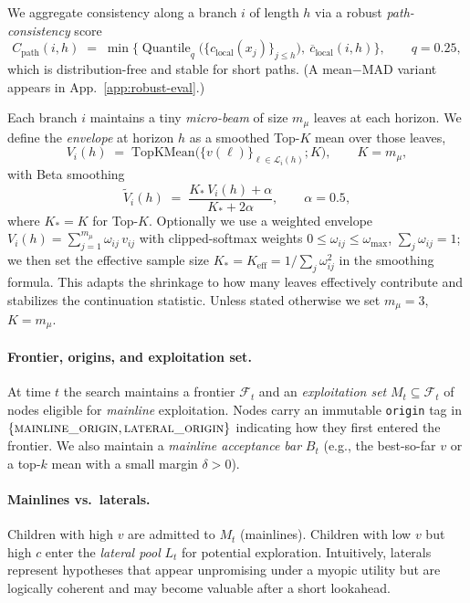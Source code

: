 \documentclass{article}
\begin{document}
We aggregate consistency along a branch $i$ of length $h$ via a robust \emph{path-consistency} score
\begin{equation}
C_{\text{path}}(i,h)\;=\;\min\!\Big\{\operatorname{Quantile}_{q}\big(\{c_{\text{local}}(x_j)\}_{j\le h}\big),\ \overline{c}_{\text{local}}(i,h)\Big\},
\qquad q=0.25,
\end{equation}
which is distribution-free and stable for short paths. (A mean$-$MAD variant appears in App.~\ref{app:robust-eval}.)

Each branch $i$ maintains a tiny \emph{micro-beam} of size $m_{\mu}$ leaves at each horizon.
We define the \emph{envelope} at horizon $h$ as a smoothed Top-$K$ mean over those leaves,
\begin{equation}
V_i(h)\;=\;\text{TopKMean}\big(\{v(\ell)\}_{\ell\in\mathcal{L}_i(h)};K\big),\qquad K=m_{\mu},
\end{equation}
with Beta smoothing
\begin{equation}
\tilde V_i(h)\;=\;\frac{K_{*}\, V_i(h)+\alpha}{K_{*}+2\alpha},\qquad \alpha=0.5,
\end{equation}
where $K_{*}{=}K$ for Top-$K$.
Optionally we use a weighted envelope $V_i(h)=\sum_{j=1}^{m_\mu}\omega_{ij}\,v_{ij}$ with clipped-softmax weights $0\!\le\!\omega_{ij}\!\le\!\omega_{\max}$, $\sum_j\omega_{ij}{=}1$;
we then set the effective sample size $K_{*}{=}K_{\mathrm{eff}}=1/\sum_j \omega_{ij}^2$ in the smoothing formula.
This adapts the shrinkage to how many leaves effectively contribute and stabilizes the continuation statistic.
Unless stated otherwise we set $m_{\mu}{=}3$, $K{=}m_{\mu}$.
\paragraph{Frontier, origins, and exploitation set.}
At time $t$ the search maintains a frontier $\mathcal{F}_t$ and an \emph{exploitation set} $M_t \subseteq \mathcal{F}_t$ of nodes eligible for \emph{mainline} exploitation.
Nodes carry an immutable \texttt{origin} tag in $\{\textsc{mainline\_origin},\textsc{lateral\_origin}\}$ indicating how they first entered the frontier.
We also maintain a \emph{mainline acceptance bar} $B_t$ (e.g., the best-so-far $v$ or a top-$k$ mean with a small margin $\delta>0$).

\paragraph{Mainlines vs.\ laterals.}
Children with high $v$ are admitted to $M_t$ (mainlines).
Children with low $v$ but high $c$ enter the \emph{lateral pool} $L_t$ for potential exploration.
Intuitively, laterals represent hypotheses that appear unpromising under a myopic utility but are logically coherent and may become valuable after a short lookahead.
\end{document}
